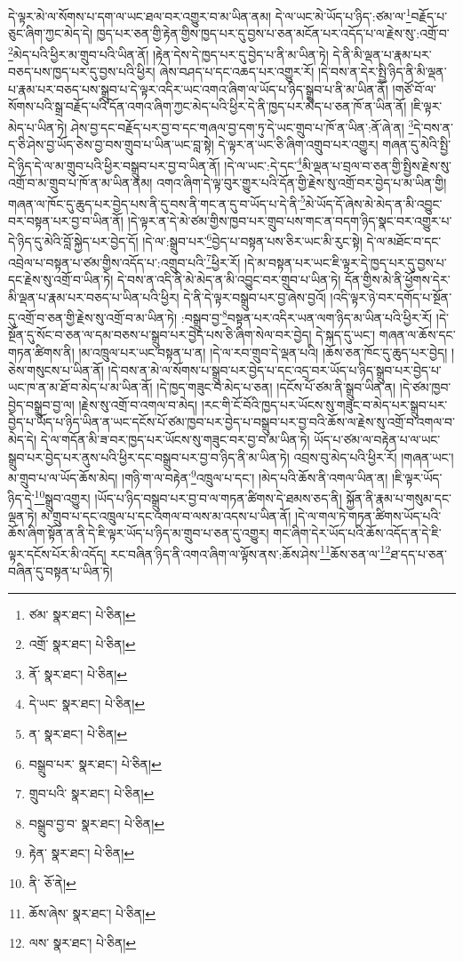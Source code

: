 དེ་ལྟར་མེ་ལ་སོགས་པ་དག་ལ་ཡང་ཐལ་བར་འགྱུར་བ་མ་ཡིན་ནམ། དེ་ལ་ཡང་མེ་ཡོད་པ་ཉིད་:ཙམ་ལ་\footnote{ཙམ་  སྣར་ཐང་།  པེ་ཅིན། }བརྗོད་པ་ཅུང་ཞིག་ཀྱང་མེད་དེ། ཁྱད་པར་ཅན་གྱི་རྟེན་གྱིས་ཁྱད་པར་དུ་བྱས་པ་ཅན་མངོན་པར་འདོད་པ་ལ་རྗེས་སུ་:འགྲོ་བ་\footnote{འགྲོ་  སྣར་ཐང་།  པེ་ཅིན། }མེད་པའི་ཕྱིར་མ་གྲུབ་པའི་ཡིན་ནོ། །རྟེན་དེས་དེ་ཁྱད་པར་དུ་བྱེད་པ་ནི་མ་ཡིན་ཏེ། དེ་ནི་མི་ལྡན་པ་རྣམ་པར་བཅད་པས་ཁྱད་པར་དུ་བྱས་པའི་ཕྱིར། ཞེས་བཤད་པ་དང་འཆད་པར་འགྱུར་རོ། །དེ་བས་ན་དེར་སྤྱི་ཉིད་ནི་མི་ལྡན་པ་རྣམ་པར་བཅད་པས་སྒྲུབ་པ་དེ་ལྟར་འདིར་ཡང་འགའ་ཞིག་ལ་ཡོད་པ་ཉིད་སྒྲུབ་པ་ནི་མ་ཡིན་ནོ། །གཙོ་བོ་ལ་སོགས་པའི་སྒྲ་བརྗོད་པའི་དོན་འགའ་ཞིག་ཀྱང་མེད་པའི་ཕྱིར་དེ་ནི་ཁྱད་པར་མེད་པ་ཅན་ཁོ་ན་ཡིན་ནོ། །ཇི་ལྟར་མེད་པ་ཡིན་ཏེ། ཤེས་བྱ་དང་བརྗོད་པར་བྱ་བ་དང་གཞལ་བྱ་དག་ཏུ་དེ་ཡང་གྲུབ་པ་ཁོ་ན་ཡིན་:ནོ་ཞེ་ན། \footnote{ནོ་  སྣར་ཐང་།  པེ་ཅིན། }དེ་བས་ན་ད་ཅི་ཤེས་བྱ་ཡོད་ཅེས་བྱ་བས་གྲུབ་པ་ཡིན་ཡང་བླ་སྟེ། དེ་ལྟར་ན་ཡང་ཅི་ཞིག་འགྲུབ་པར་འགྱུར། གཞན་དུ་མེའི་སྤྱི་དེ་ཉིད་དེ་ལ་མ་གྲུབ་པའི་ཕྱིར་བསྒྲུབ་པར་བྱ་བ་ཡིན་ནོ། །དེ་ལ་ཡང་:དེ་དང་\footnote{དེ་ཡང་  སྣར་ཐང་།  པེ་ཅིན། }མི་ལྡན་པ་བྲལ་བ་ཅན་གྱི་སྤྱིས་རྗེས་སུ་འགྲོ་བ་མ་གྲུབ་པ་ཁོ་ན་མ་ཡིན་ནམ། འགའ་ཞིག་དེ་ལྟ་བུར་གྱུར་པའི་དོན་གྱི་རྗེས་སུ་འགྲོ་བར་བྱེད་པ་མ་ཡིན་གྱི། གཞན་ལ་ཁོང་དུ་ཆུད་པར་བྱེད་པས་ནི་དུ་བས་ནི་གང་ན་དུ་བ་ཡོད་པ་དེ་ནི་\footnote{ན་  སྣར་ཐང་།  པེ་ཅིན། }མེ་ཡོད་དོ་ཞེས་མེ་མེད་ན་མི་འབྱུང་བར་བསྟན་པར་བྱ་བ་ཡིན་ནོ། །དེ་ལྟར་ན་དེ་མེ་ཙམ་གྱིས་ཁྱབ་པར་གྲུབ་པས་གང་ན་བདག་ཉིད་སྣང་བར་འགྱུར་པ་དེ་ཉིད་དུ་མེའི་བློ་སྐྱེད་པར་བྱེད་དོ། །དེ་ལ་:སྒྲུབ་པར་\footnote{བསྒྲུབ་པར་  སྣར་ཐང་།  པེ་ཅིན། }བྱེད་པ་བསྟན་པས་ཅིར་ཡང་མི་རུང་སྟེ། དེ་ལ་མཐོང་བ་དང་འབྲེལ་པ་བསྟན་པ་ཙམ་གྱིས་འདོད་པ་:འགྲུབ་པའི་\footnote{གྲུབ་པའི་  སྣར་ཐང་།  པེ་ཅིན། }ཕྱིར་རོ། །དེ་མ་བསྟན་པར་ཡང་ཇི་ལྟར་དེ་ཁྱད་པར་དུ་བྱས་པ་དང་རྗེས་སུ་འགྲོ་བ་ཡིན་ཏེ། དེ་བས་ན་འདི་ནི་མེ་མེད་ན་མི་འབྱུང་བར་གྲུབ་པ་ཡིན་ཏེ། དོན་གྱིས་མེ་ནི་ཕྱོགས་དེར་མི་ལྡན་པ་རྣམ་པར་བཅད་པ་ཡིན་པའི་ཕྱིར། དེ་ནི་དེ་ལྟར་བསྒྲུབ་པར་བྱ་ཞེས་བྱའོ། །འདི་ལྟར་ཉེ་བར་དགོད་པ་སྔོན་དུ་འགྲོ་བ་ཅན་གྱི་རྗེས་སུ་འགྲོ་བ་མ་ཡིན་ཏེ། :བསྒྲུབ་བྱ་\footnote{བསྒྲུབ་བྱ་བ་  སྣར་ཐང་།  པེ་ཅིན། }བསྟན་པར་འདིར་ཡན་ལག་ཉིད་མ་ཡིན་པའི་ཕྱིར་རོ། །དེ་སྔོན་དུ་སོང་བ་ཅན་ལ་དམ་བཅས་པ་སྒྲུབ་པར་བྱེད་པས་ཅི་ཞིག་སེལ་བར་བྱེད། དེ་སྐད་དུ་ཡང་། གཞན་ལ་ཆོས་དང་གཏན་ཚིགས་ནི། །མ་འཁྲུལ་པར་ཡང་བསྟན་པ་ན། །དེ་ལ་རབ་གྲུབ་དེ་ལྡན་པའི། །ཆོས་ཅན་ཁོང་དུ་ཆུད་པར་བྱེད། །ཅེས་གསུངས་པ་ཡིན་ནོ། །དེ་བས་ན་མེ་ལ་སོགས་པ་སྒྲུབ་པར་བྱེད་པ་དང་འདྲ་བར་ཡོད་པ་ཉིད་སྒྲུབ་པར་བྱེད་པ་ཡང་ཁ་ན་མ་ཐོ་བ་མེད་པ་མ་ཡིན་ནོ། །དེ་ཁྱད་གཟུང་བ་མེད་པ་ཅན། །དངོས་པོ་ཙམ་ནི་སྒྲུབ་ཡིན་ན། །དེ་ཙམ་ཁྱབ་བྱེད་བསྒྲུབ་བྱ་ལ། །རྗེས་སུ་འགྲོ་བ་འགལ་བ་མེད། །རང་གི་ངོ་བོའི་ཁྱད་པར་ཡོངས་སུ་གཟུང་བ་མེད་པར་སྒྲུབ་པར་བྱེད་པ་ཡོད་པ་ཉིད་ཡིན་ན་ཡང་དངོས་པོ་ཙམ་ཁྱབ་པར་བྱེད་པ་བསྒྲུབ་པར་བྱ་བའི་ཆོས་ལ་རྗེས་སུ་འགྲོ་བ་འགལ་བ་མེད་དེ། དེ་ལ་གདོན་མི་ཟ་བར་ཁྱད་པར་ཡོངས་སུ་གཟུང་བར་བྱ་བ་མ་ཡིན་ཏེ། ཡོད་པ་ཙམ་ལ་བརྟེན་པ་ལ་ཡང་སྒྲུབ་པར་བྱེད་པར་ནུས་པའི་ཕྱིར་དང་བསྒྲུབ་པར་བྱ་བ་ཉིད་ནི་མ་ཡིན་ཏེ། འབྲས་བུ་མེད་པའི་ཕྱིར་རོ། །གཞན་ཡང་། མ་གྲུབ་པ་ལ་ཡོད་ཆོས་མེད། །གཉི་ག་ལ་བརྟེན་\footnote{རྟེན་  སྣར་ཐང་།  པེ་ཅིན། }འཁྲུལ་པ་དང་། །མེད་པའི་ཆོས་ནི་འགལ་ཡིན་ན། །ཇི་ལྟར་ཡོད་ཉིད་དེ་\footnote{ནི་  ཅོ་ནེ། }སྒྲུབ་འགྱུར། །ཡོད་པ་ཉིད་བསྒྲུབ་པར་བྱ་བ་ལ་གཏན་ཚིགས་དེ་ཐམས་ཅད་ནི། སྐྱོན་ནི་རྣམ་པ་གསུམ་དང་ལྡན་ཏེ། མ་གྲུབ་པ་དང་འཁྲུལ་པ་དང་འགལ་བ་ལས་མ་འདས་པ་ཡིན་ནོ། །དེ་ལ་གལ་ཏེ་གཏན་ཚིགས་ཡོད་པའི་ཆོས་ཞིག་སྟོན་ན་ནི་དེ་ཇི་ལྟར་ཡོད་པ་ཉིད་མ་གྲུབ་པ་ཅན་དུ་འགྱུར། གང་ཞིག་དེར་ཡོད་པའི་ཆོས་འདོད་ན་དེ་ཇི་ལྟར་དངོས་པོར་མི་འདོད། རང་བཞིན་ཉིད་ནི་འགའ་ཞིག་ལ་ལྟོས་ནས་:ཆོས་ཤེས་\footnote{ཆོས་ཞེས་  སྣར་ཐང་།  པེ་ཅིན། }ཆོས་ཅན་ལ་\footnote{ལས་  སྣར་ཐང་།  པེ་ཅིན། }ཐ་དད་པ་ཅན་བཞིན་དུ་བསྟན་པ་ཡིན་ཏེ། 